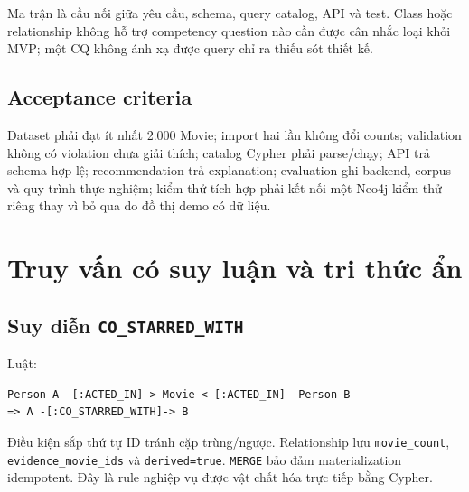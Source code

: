 Ma trận là cầu nối giữa yêu cầu, schema, query catalog, API và test. Class hoặc
relationship không hỗ trợ competency question nào cần được cân nhắc loại khỏi
MVP; một CQ không ánh xạ được query chỉ ra thiếu sót thiết kế.

\subsection{Acceptance criteria}

Dataset phải đạt ít nhất 2.000 Movie; import hai lần không đổi counts; validation
không có violation chưa giải thích; catalog Cypher phải parse/chạy; API trả
schema hợp lệ; recommendation trả explanation; evaluation ghi backend, corpus và
quy trình thực nghiệm; kiểm thử tích hợp phải kết nối một Neo4j kiểm thử riêng
thay vì bỏ qua do đồ thị
demo có dữ liệu.

\section{Truy vấn có suy luận và tri thức ẩn}

\subsection{Suy diễn \texttt{CO\_STARRED\_WITH}}

Luật:

\begin{Verbatim}[fontsize=\scriptsize,frame=single]
Person A -[:ACTED_IN]-> Movie <-[:ACTED_IN]- Person B
=> A -[:CO_STARRED_WITH]-> B
\end{Verbatim}

Điều kiện sắp thứ tự ID tránh cặp trùng/ngược. Relationship lưu \texttt{movie\_count},
\texttt{evidence\_movie\_ids} và \texttt{derived=true}. \texttt{MERGE} bảo đảm materialization idempotent.
Đây là rule nghiệp vụ được vật chất hóa trực tiếp bằng Cypher.
